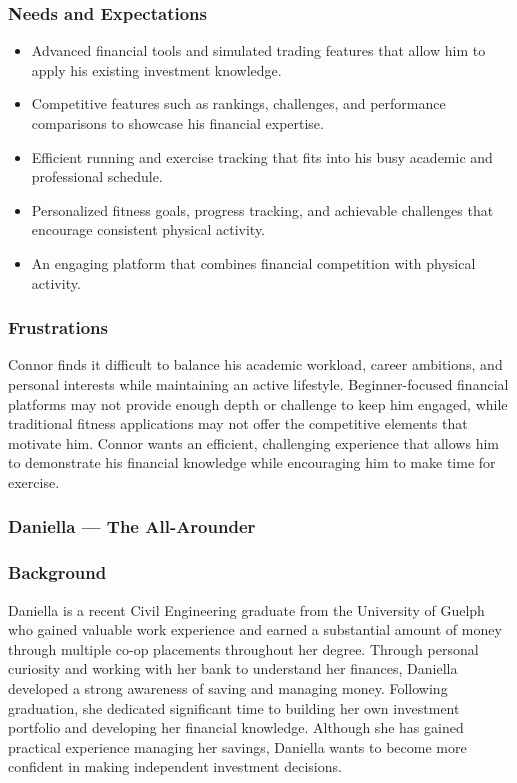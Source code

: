 \documentclass[12pt]{article}
\begin{document}
\subsubsection*{Needs and Expectations}
\begin{itemize}
    \item Advanced financial tools and simulated trading features that allow him to apply his existing investment knowledge.
    \item Competitive features such as rankings, challenges, and performance comparisons to showcase his financial expertise.
    \item Efficient running and exercise tracking that fits into his busy academic and professional schedule.
    \item Personalized fitness goals, progress tracking, and achievable challenges that encourage consistent physical activity.
    \item An engaging platform that combines financial competition with physical activity.
\end{itemize}

\subsubsection*{Frustrations}
Connor finds it difficult to balance his academic workload, career ambitions, and personal interests while maintaining an active lifestyle. Beginner-focused financial platforms may not provide enough depth or challenge to keep him engaged, while traditional fitness applications may not offer the competitive elements that motivate him. Connor wants an efficient, challenging experience that allows him to demonstrate his financial knowledge while encouraging him to make time for exercise.
\subsubsection{Daniella — The All-Arounder}
\subsubsection*{Background}
Daniella is a recent Civil Engineering graduate from the University of Guelph who gained valuable work experience and earned a substantial amount of money through multiple co-op placements throughout her degree. Through personal curiosity and working with her bank to understand her finances, Daniella developed a strong awareness of saving and managing money. Following graduation, she dedicated significant time to building her own investment portfolio and developing her financial knowledge. Although she has gained practical experience managing her savings, Daniella wants to become more confident in making independent investment decisions.
\end{document}
